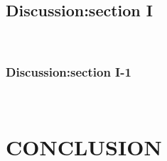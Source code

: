 \documentclass[doctor]{snuee}
\begin{document}
\section{Discussion:section I}
\lipsum[1-4]~\cite{anderson1964hard}

\subsection{Discussion:section I-1}
\lipsum[1-4]~\cite{anderson1964hard}

\chapter{CONCLUSION}
\lipsum[1-4]~\cite{anderson1964hard}

\appendix
\newpage
\makeatletter
\makeatother
\end{document}
